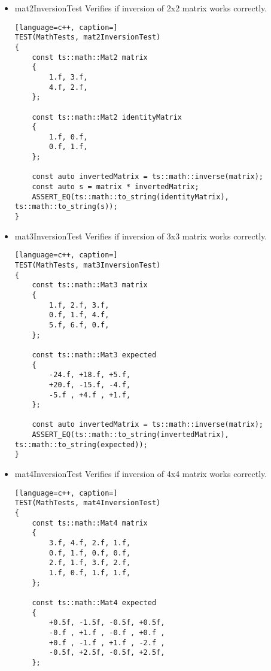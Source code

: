 \begin{itemize}
\begin{itemize}
\begin{lstlisting}[language=c++, caption=]
    const ts::math::Mat3 expected
    {
        0.216f, 0.231f, 0.246f,
        0.342f, 0.366f, 0.39f ,
        0.09f , 0.096f, 0.102f,
    };

    const auto multiplication = rightMatrix * leftMatrix;
    ASSERT_EQ(ts::math::to_string(expected), ts::math::to_string(multiplication));
}
            \end{lstlisting}
            \item mat2InversionTest Verifies if inversion of 2x2 matrix works correctly.
            \begin{lstlisting}[language=c++, caption=]
TEST(MathTests, mat2InversionTest)
{
    const ts::math::Mat2 matrix
    {
        1.f, 3.f,
        4.f, 2.f,
    };

    const ts::math::Mat2 identityMatrix
    {
        1.f, 0.f,
        0.f, 1.f,
    };

    const auto invertedMatrix = ts::math::inverse(matrix);
    const auto s = matrix * invertedMatrix;
    ASSERT_EQ(ts::math::to_string(identityMatrix), ts::math::to_string(s));
}
            \end{lstlisting}
            \item mat3InversionTest Verifies if inversion of 3x3 matrix works correctly.
            \begin{lstlisting}[language=c++, caption=]
TEST(MathTests, mat3InversionTest)
{
    const ts::math::Mat3 matrix
    {
        1.f, 2.f, 3.f,
        0.f, 1.f, 4.f,
        5.f, 6.f, 0.f,
    };

    const ts::math::Mat3 expected
    {
        -24.f, +18.f, +5.f,
        +20.f, -15.f, -4.f,
        -5.f , +4.f , +1.f,
    };

    const auto invertedMatrix = ts::math::inverse(matrix);
    ASSERT_EQ(ts::math::to_string(invertedMatrix), ts::math::to_string(expected));
}
            \end{lstlisting}
            \item mat4InversionTest Verifies if inversion of 4x4 matrix works correctly.
            \begin{lstlisting}[language=c++, caption=]
TEST(MathTests, mat4InversionTest)
{
    const ts::math::Mat4 matrix
    {
        3.f, 4.f, 2.f, 1.f,
        0.f, 1.f, 0.f, 0.f,
        2.f, 1.f, 3.f, 2.f,
        1.f, 0.f, 1.f, 1.f,
    };

    const ts::math::Mat4 expected
    {
        +0.5f, -1.5f, -0.5f, +0.5f,
        -0.f , +1.f , -0.f , +0.f ,
        +0.f , -1.f , +1.f , -2.f ,
        -0.5f, +2.5f, -0.5f, +2.5f,
    };


\end{lstlisting}
\end{itemize}
\end{itemize}

